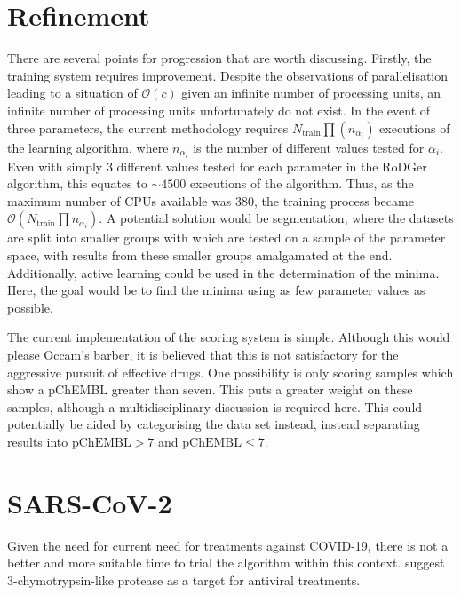 \section{Refinement}
There are several points for progression that are worth discussing. Firstly, the training system requires improvement. Despite the observations of parallelisation leading to a situation of $\mathcal{O}(c)$ given an infinite number of processing units, an infinite number of processing units unfortunately do not exist. In the event of three parameters, the current methodology requires $N_\mathrm{train}\prod(n_{\alpha_i})$ executions of the learning algorithm, where $n_{\alpha_i}$ is the number of different values tested for $\alpha_i$. Even with simply 3 different values tested for each parameter in the RoDGer algorithm, this equates to $\sim{}4500$ executions of the algorithm. Thus, as the maximum number of CPUs available was 380, the training process became $\mathcal{O}\left(N_\mathrm{train}\prod{n_{\alpha_i}}\right)$. A potential solution would be segmentation, where the datasets are split into smaller groups with which are tested on a sample of the parameter space, with results from these smaller groups amalgamated at the end. Additionally, active learning could be used in the determination of the minima. Here, the goal would be to find the minima using as few parameter values as possible.

The current implementation of the scoring system is simple. Although this would please Occam's barber, it is believed that this is not satisfactory for the aggressive pursuit of effective drugs. One possibility is only scoring samples which show a pChEMBL greater than seven. This puts a greater weight on these samples, although a multidisciplinary discussion is required here. This could potentially be aided by categorising the data set instead, instead separating results into $\mathrm{pChEMBL}>7$ and $\mathrm{pChEMBL}\leq{}7$.

\section{SARS-CoV-2}
Given the need for current need for treatments against COVID-19, there is not a better and more suitable time to trial the algorithm within this context. \textcite{prot20} suggest 3-chymotrypsin-like protease as a target for antiviral treatments.